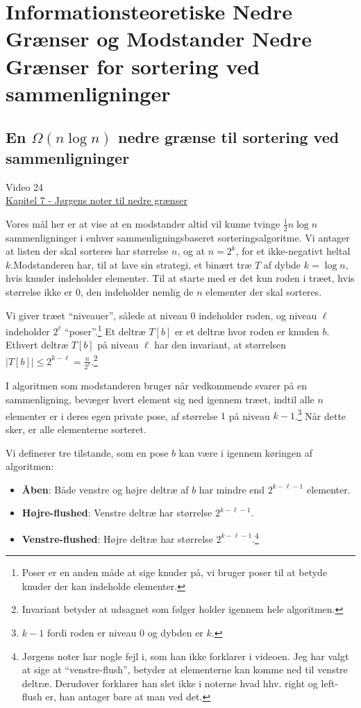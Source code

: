 \chapter{Informationsteoretiske Nedre Grænser og Modstander Nedre Grænser for sortering ved sammenligninger}

\section{En $\Omega (n \log n)$ nedre grænse til sortering ved sammenligninger}%
\label{sec:sorteringsalgoritmesammenligninger}

\begin{note}[Kilder]
Video 24 \\
\href{https://imada.sdu.dk/u/jbj/DM553/LBnoteJBJ21.pdf}{Kapitel 7 - Jørgens noter til nedre grænser}
\end{note}

Vores mål her er at vise at en modstander altid vil kunne tvinge $\frac{1}{2}n \log n$ sammenligninger i enhver sammenligningsbaseret sorteringsalgoritme. Vi antager at listen der skal sorteres har størrelse $n$, og at $n = 2^{k}$, for et ikke-negativt heltal $k$.Modstanderen har, til at lave sin strategi, et binært træ $T$ af dybde $k = \log n$, hvis knuder indeholder elementer. Til at starte med er det kun roden i træet, hvis størrelse ikke er 0, den indeholder nemlig de $n$ elementer der skal sorteres.

Vi giver træet ``niveauer'', sålede at niveau 0 indeholder roden, og niveau $\ell$ indeholder $2^{\ell}$ ``poser''.\footnote{Poser er en anden måde at sige knuder på, vi bruger poser til at betyde knuder der kan indeholde elementer.} Et deltræ $T[b]$ er et deltræ hvor roden er knuden $b$. Ethvert deltræ $T[b]$ på niveau $\ell$ har den invariant, at størrelsen $|T[b]| \le 2^{k-\ell} = \frac{n}{2^{\ell}}$.\footnote{Invariant betyder at udsagnet som følger holder igennem hele algoritmen.}

I algoritmen som modstanderen bruger når vedkommende svarer på en sammenligning, bevæger hvert element sig ned igennem træet, indtil alle $n$ elementer er i deres egen private pose, af størrelse $1$ på niveau $k-1$.\footnote{$k-1$ fordi roden er niveau $0$ og dybden er $k$.} Når dette sker, er alle elementerne sorteret.

Vi definerer tre tilstande, som en pose $b$ kan være i igennem køringen af algoritmen:
\begin{itemize}
  \item \textbf{Åben}: Både venstre og højre deltræ af $b$  har mindre end $2^{k-\ell-1}$ elementer.
  \item \textbf{Højre-flushed}: Venstre deltræ har størrelse $2^{k-\ell-1}$.
  \item \textbf{Venstre-flushed}: Højre deltræ har størrelse $2^{k-\ell-1}$.\footnote{Jørgens noter har nogle fejl i, som han ikke forklarer i videoen. Jeg har valgt at sige at ``venstre-flush'', betyder at elementerne kan komme ned til venstre deltræ. Derudover forklarer han slet ikke i noterne hvad hhv. right og left-flush er, han antager bare at man ved det.}
\end{itemize}

